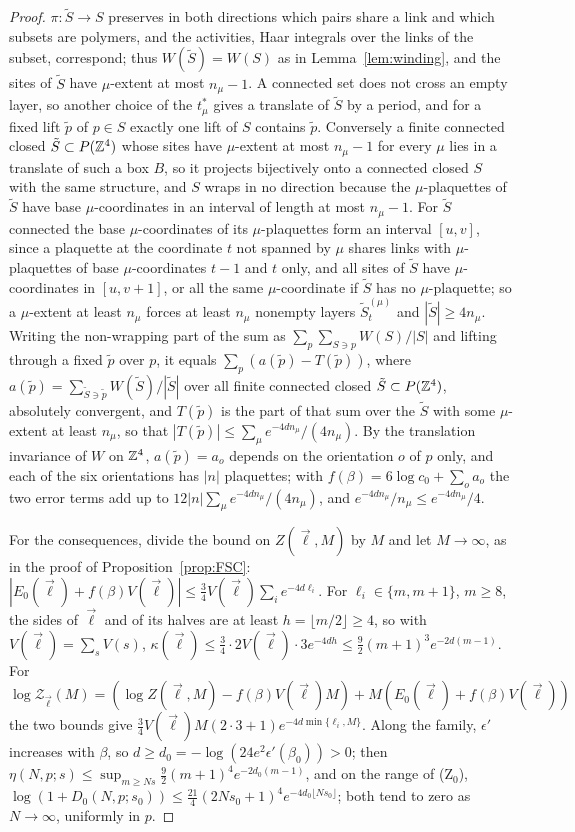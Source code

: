\begin{proof}
$\pi:\tilde S\to S$ preserves in both directions which pairs share a link
and which subsets are polymers, and the activities, Haar integrals over the
links of the subset, correspond; thus $W(\tilde S)=W(S)$ as in
Lemma~\ref{lem:winding}, and the sites of $\tilde S$ have $\mu$-extent at
most $n_\mu-1$. A connected set does not cross an empty layer, so another
choice of the $t^*_\mu$ gives a translate of $\tilde S$ by a period, and
for a fixed lift $\tilde p$ of $p\in S$ exactly one lift of $S$ contains
$\tilde p$. Conversely a finite connected closed $\tilde S\subset P(\mathbb{Z}^4)$
whose sites have $\mu$-extent at most $n_\mu-1$ for every $\mu$ lies in a
translate of such a box $B$, so it projects bijectively onto a connected
closed $S$ with the same structure, and $S$ wraps in no direction because
the $\mu$-plaquettes of $\tilde S$ have base $\mu$-coordinates in an
interval of length at most $n_\mu-1$. For $\tilde S$ connected the base
$\mu$-coordinates of its $\mu$-plaquettes form an interval $[u,v]$, since a
plaquette at the coordinate $t$ not spanned by $\mu$ shares links with
$\mu$-plaquettes of base $\mu$-coordinates $t-1$ and $t$ only, and all sites
of $\tilde S$ have $\mu$-coordinates in $[u,v+1]$, or all the same
$\mu$-coordinate if $\tilde S$ has no $\mu$-plaquette; so a $\mu$-extent at
least $n_\mu$ forces at least $n_\mu$ nonempty layers $\tilde S^{(\mu)}_t$
and $|\tilde S|\ge4n_\mu$. Writing the non-wrapping part of the sum as
$\sum_p\sum_{S\ni p}W(S)/|S|$ and lifting through a fixed $\tilde p$ over
$p$, it equals $\sum_p(a(\tilde p)-T(\tilde p))$, where $a(\tilde p)=\sum_{
\tilde S\ni\tilde p}W(\tilde S)/|\tilde S|$ over all finite connected closed
$\tilde S\subset P(\mathbb{Z}^4)$, absolutely convergent, and $T(\tilde p)$ is the
part of that sum over the $\tilde S$ with some $\mu$-extent at least
$n_\mu$, so that $|T(\tilde p)|\le\sum_\mu e^{-4dn_\mu}/(4n_\mu)$. By the
translation invariance of $W$ on $\mathbb{Z}^4$, $a(\tilde p)=a_o$ depends on the
orientation $o$ of $p$ only, and each of the six orientations has $|n|$
plaquettes; with $f(\beta)=6\log c_0+\sum_oa_o$ the two error terms add up
to $12|n|\sum_\mu e^{-4dn_\mu}/(4n_\mu)$, and $e^{-4dn_\mu}/n_\mu\le e^{-4d
n_\mu}/4$.

For the consequences, divide the bound on $Z(\vec\ell,M)$ by $M$ and let
$M\to\infty$, as in the proof of Proposition~\ref{prop:FSC}: $|E_0(\vec\ell)
+f(\beta)V(\vec\ell)|\le\frac34V(\vec\ell)\sum_ie^{-4d\ell_i}$. For
$\ell_i\in\{m,m+1\}$, $m\ge8$, the sides of $\vec\ell$ and of its halves are
at least $h=\lfloor m/2\rfloor\ge4$, so with $V(\vec\ell)=\sum_sV(s)$,
$\kappa(\vec\ell)\le\frac34\cdot2V(\vec\ell)\cdot3e^{-4dh}\le\frac92(m+1)^3
e^{-2d(m-1)}$. For $\log\mathcal Z_{\vec\ell}(M)=(\log Z(\vec\ell,M)-f(\beta)
V(\vec\ell)M)+M(E_0(\vec\ell)+f(\beta)V(\vec\ell))$ the two bounds give
$\frac34V(\vec\ell)M(2\cdot3+1)e^{-4d\min\{\ell_i,M\}}$. Along the family,
$\epsilon'$ increases with $\beta$, so $d\ge d_0=-\log(24e^2\epsilon'(\beta_0))
>0$; then $\eta(N,p;s)\le\sup_{m\ge Ns}\frac92(m+1)^4e^{-2d_0(m-1)}$, and on
the range of (Z$_0$), $\log(1+D_0(N,p;s_0))\le\frac{21}4(2Ns_0+1)^4e^{-4d_0
\lfloor Ns_0\rfloor}$; both tend to zero as $N\to\infty$, uniformly in $p$.
\end{proof}

